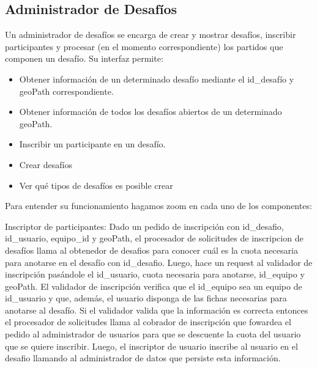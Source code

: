 \subsection{Administrador de Desafíos}


Un administrador de desafíos se encarga de crear y mostrar desafíos, inscribir participantes y procesar (en el momento correspondiente) los partidos que componen un desafío.
Su interfaz permite:
\begin{itemize}
	\item Obtener información de un determinado desafío mediante el id_desafío y geoPath correspondiente.
	\item Obtener información de todos los desafíos abiertos de un determinado geoPath.
	\item Inscribir un participante en un desafío.
	\item Crear desafíos
	\item Ver qué tipos de desafíos es posible crear
\end{itemize}

Para entender su funcionamiento hagamos zoom en cada uno de los componentes:


Inscriptor de participantes: Dado un pedido de inscripción con id_desafio, id_usuario, equipo_id y geoPath, el procesador de solicitudes de inscripcion de desafíos llama al
obtenedor de desafios para conocer cuál es la cuota necesaria para anotarse en el desafío con id_desafio. Luego, hace un request al validador de inscripción pasándole el id_usuario, cuota
necesaria para anotarse, id_equipo y geoPath. El validador de inscripción verifica que el id_equipo sea un equipo de id_usuario y que, además, el usuario disponga de las fichas necesarias
para anotarse al desafío. Si el validador valida que la información es correcta entonces el procesador de solicitudes llama al cobrador de inscripción que fowardea el pedido al administrador de usuarios para que se descuente la cuota del usuario que se quiere inscribir. Luego, el inscriptor de usuario inscribe al usuario en el desafio llamando al administrador
de datos que persiste esta información.

